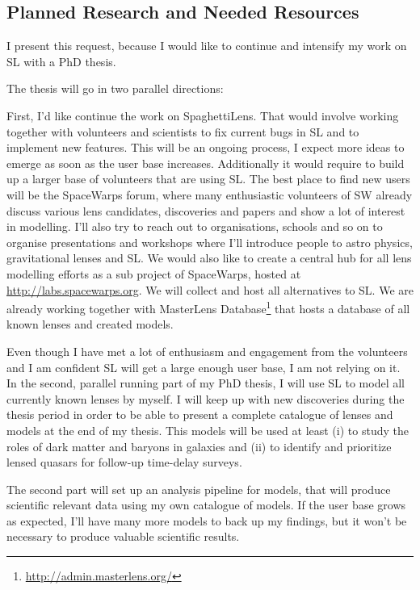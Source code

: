 \documentclass[11pt]{article}
\begin{document}
\subsection{Planned Research and Needed Resources}

I present this request, because I would like to continue and intensify my work on SL with a PhD thesis.

The thesis will go in two parallel directions:

First, I'd like continue the work on SpaghettiLens.
That would involve working together with volunteers and scientists to fix current bugs in SL and to implement new features.
This will be an ongoing process, I expect more ideas to emerge as soon as the user base increases.
Additionally it would require to build up a larger base of volunteers that are using SL.
The best place to find new users will be the SpaceWarps forum, where many enthusiastic volunteers of SW already discuss various lens candidates, discoveries and papers and show a lot of interest in modelling.
I'll also try to reach out to organisations, schools and so on to organise presentations and workshops where I'll introduce people to astro physics, gravitational lenses and SL.
We would also like to create a central hub for all lens modelling efforts as a sub project of SpaceWarps, hosted at \url{http://labs.spacewarps.org}.
We will collect and host all alternatives to SL.
We are already working together with MasterLens Database\footnote{\url{http://admin.masterlens.org/}} that hosts a database of all known lenses and created models.


Even though I have met a lot of enthusiasm and engagement from the volunteers and I am confident SL will get a large enough user base, I am not relying on it.
In the second, parallel running part of my PhD thesis, I will use SL to model all currently known lenses by myself.
I will keep up with new discoveries during the thesis period in order to be able to present a complete catalogue of lenses and models at the end of my thesis.
This models will be used at least (i) to study the roles of dark matter and baryons in galaxies and (ii) to identify and prioritize lensed quasars for follow-up time-delay surveys.

The second part will set up an analysis pipeline for models, that will produce scientific relevant data using my own catalogue of models.
If the user base grows as expected, I'll have many more models to back up my findings, but it won't be necessary to produce valuable scientific results.
\end{document}
